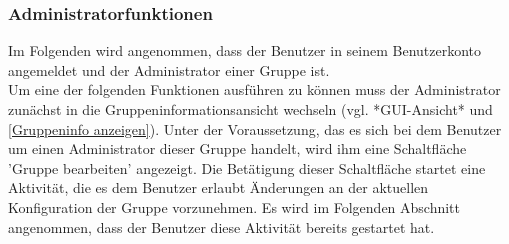 \documentclass[parskip=full]{scrartcl}
\begin{document}
\subsubsection{Administratorfunktionen}
Im Folgenden wird angenommen, dass der Benutzer in seinem Benutzerkonto angemeldet und der Administrator einer Gruppe ist.\\
Um eine der folgenden Funktionen ausführen zu können muss der Administrator zunächst in die Gruppeninformationsansicht wechseln (vgl. *GUI-Ansicht* und \ref{Gruppeninfo anzeigen}). Unter der Voraussetzung, das es sich bei dem Benutzer um einen Administrator dieser Gruppe handelt, wird ihm eine Schaltfläche 'Gruppe bearbeiten' angezeigt. Die Betätigung dieser Schaltfläche startet eine Aktivität, die es dem Benutzer erlaubt Änderungen an der aktuellen Konfiguration der Gruppe vorzunehmen. Es wird im Folgenden Abschnitt angenommen, dass der Benutzer diese Aktivität bereits gestartet hat.
\end{document}
